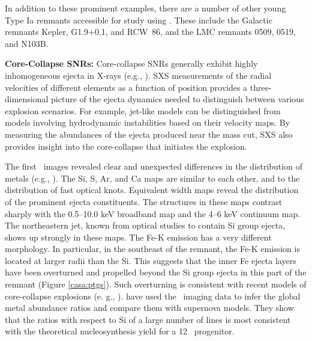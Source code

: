 \documentclass[11pt,a4paper]{article}
\begin{document}
{In addition to these prominent examples, there are a number of other
young Type Ia remnants accessible for study using \ah.  These
include the Galactic remnants Kepler, G1.9+0.1, and RCW~86, and the
LMC remnants 0509, 0519, and N103B.

{\bf Core-Collapse SNRs:} Core-collapse SNRs generally exhibit highly
inhomogeneous ejecta in X-rays (e.g., \citealt{hughes00b, hwang04,
  park07}).  SXS measurements of the radial velocities of different
elements as a function of position provides a three-dimensional
picture of the ejecta dynamics needed to distinguish between various
explosion scenarios. For example, jet-like models can be distinguished
from models involving hydrodynamic instabilities based on their
velocity maps. By measuring the abundances of the ejecta produced near
the mass cut, SXS also provides insight into the core-collapse that
initiates the explosion.

The first \chandra\ images revealed clear and unexpected differences
in the distribution of metals (e.g., \citealt{hughes00b,
    hwang00a}). The Si, S, Ar, and Ca maps are similar to each other,
  and to the distribution of fast optical knots. Equivalent width maps
  reveal the distribution of the prominent ejecta constituents. The
  structures in these maps contrast sharply with the 0.5--10.0 keV
  broadband map and the 4--6 keV continuum map. The northeastern jet,
  known from optical studies to contain Si group ejecta, shows up
  strongly in these maps. The Fe-K emission has a very different
  morphology. In particular, in the southeast of the remnant, the Fe-K
  emission is located at larger radii than the Si. This suggests that
  the inner Fe ejecta layers have been overturned and propelled beyond
  the Si group ejecta in this part of the remnant (Figure \ref{casa:ptgs}). Such
  overturning is consistent with recent models of core-collapse
  explosions (e. g., \citealt{burrows95}). \citet{willingale02} have
  used the \xmm\ imaging data to infer the global metal abundance
  ratios and compare them with supernova models. They show that the
  ratios with respect to Si of a large number of lines is most
  consistent with the theoretical nucleosynthesis yield for a 12 \msun\
  progenitor.

}
\end{document}
